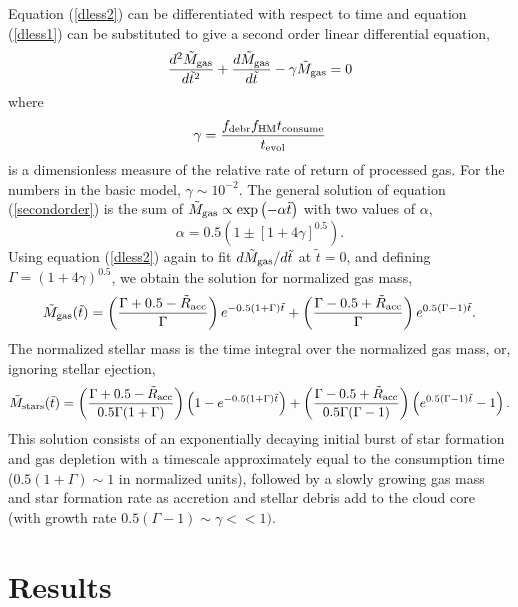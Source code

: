 \documentclass[12pt,preprint]{aastex}
\begin{document}
Equation (\ref{dless2}) can be differentiated with respect to time and equation
(\ref{dless1}) can be substituted to give a second order linear differential
equation,
\begin{equation}
{{d^2{\tilde M}_{\rm gas}}\over{d{\tilde t}^2}}+
{{d{\tilde M}_{\rm gas}}\over{d{\tilde t}}}-\gamma{\tilde M}_{\rm gas}=0
\end{equation}
where
\begin{equation}
\gamma={{f_{\rm debr}f_{\rm HM}t_{\rm consume}}\over{t_{\rm evol}}}
\label{secondorder}
\end{equation}
is a dimensionless measure of the relative rate of return of processed gas. For the
numbers in the basic model, $\gamma\sim10^{-2}$. The general solution of equation
(\ref{secondorder}) is the sum of ${\tilde M}_{\rm gas}\propto\exp\left({-\alpha
{\tilde t}}\right)$ with two values of $\alpha$,
\begin{equation}
\alpha=0.5\left(1\pm\left[1+4\gamma\right]^{0.5}\right).
\end{equation}
Using equation (\ref{dless2}) again to fit $d{\tilde M}_{\rm gas}/d{\tilde t}$ at
${\tilde t}=0$, and defining $\Gamma=(1+4\gamma)^{0.5}$, we obtain the solution for
normalized gas mass,
\begin{equation}
{\tilde M}_{\rm gas}({\tilde t})=\left({{\Gamma+0.5-{\tilde R}_{\rm acc}}\over{\Gamma}}\right)
e^{-0.5(1+\Gamma){\tilde t}}
+\left({{\Gamma-0.5+{\tilde R}_{\rm acc}}\over{\Gamma}}\right)e^{0.5(\Gamma-1){\tilde t}}.
\label{total}
\end{equation}
The normalized stellar mass is the time integral over the normalized gas mass, or,
ignoring stellar ejection,
\begin{equation}
{\tilde M}_{\rm stars}({\tilde t})=
\left({{\Gamma+0.5-{\tilde R}_{\rm acc}}\over{0.5\Gamma(1+\Gamma)}}\right)
\left(1-e^{-0.5(1+\Gamma){\tilde t}}\right)
+\left({{\Gamma-0.5+{\tilde R}_{\rm acc}}\over{0.5\Gamma(\Gamma-1)}}\right)
\left(e^{0.5(\Gamma-1){\tilde t}}-1\right).
\end{equation}
This solution consists of an exponentially decaying initial burst of star formation
and gas depletion with a timescale approximately equal to the consumption time
($0.5(1+\Gamma)\sim1$ in normalized units), followed by a slowly growing gas mass
and star formation rate as accretion and stellar debris add to the cloud core (with
growth rate $0.5(\Gamma-1)\sim\gamma<<1)$.

\section{Results}
\label{results}
\end{document}
